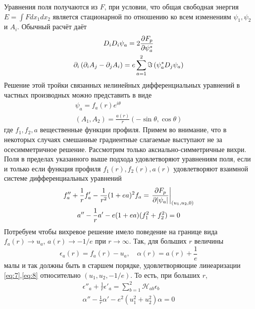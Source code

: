 Уравнения поля получаются из \( F \), при условии, что общая свободная энергия 
\( E = \int F dx_1 dx_2 \) является стационарной по отношению ко всем 
изменениям \( \psi_1, \psi_2 \) и \( A_i \). Обычный расчёт даёт 
\begin{gather}
    D_i D_i \psi_a = 2\frac{\partial F_p}{\partial \psi_a^{*}}
    \label{eq:4} \\
    \partial_i \left( \partial_i A_j - \partial_j A_i \right) = 
        e\sum\limits_{a=1}^{2}\Im\left( \psi_a^* D_j \psi_a \right)
    \label{eq:5}
\end{gather}
Решение этой тройки связанных нелинейных дифференциальных уравнений в частных 
производных можно представить в виде
\begin{gather}
    \psi_a = f_a(r)e^{i\theta} \nonumber \\
    (A_1, A_2) = \frac{a(r)}{r}(-\sin\theta, \cos\theta)
    \label{eq:6}
\end{gather}
где \( f_1, f_2, a \) вещественные функции профиля. Примем во внимание, что 
в некоторых случаях смешанные градиентные слагаемые выступают не за 
осесимметричное решение. Рассмотрим только аксиально-симметричные вихри. 
Поля в пределах указанного выше подхода удовлетворяют уравнениям поля, если и 
только если функция профиля \( f_1(r), f_2(r), a(r) \) удовлетворяют взаимной 
системе дифференциальных уравнений
\begin{gather}
    f''_a + \frac{1}{r} f'_a - \frac{1}{r^2}(1+ea)^2 f_a = 
        \left. \frac{\partial F_p}{\partial |\psi_a|} \right|_{(u_1, u_2, 0)}
    \label{eq:7} \\
    a'' - \frac{1}{r} a' - e(1+ea)(f_1^2+f_2^2) = 0
    \label{eq:8}
\end{gather}
Потребуем чтобы вихревое решение имело поведение на границе вида 
\( f_a(r) \rightarrow u_a \), \( a(r) \rightarrow -1/e \) при
\( r \rightarrow \infty \). Так, для больших \( r \) величины
\begin{equation}
    \epsilon_a(r) = f_a(r) - u_a, \quad
    \alpha(r) = a(r) + \frac{1}{e}
    \label{eq:9}
\end{equation}
малы и так должны быть в старшем порядке, удовлетворяющие линеаризации 
\eqref{eq:7},\eqref{eq:8} относительно \( (u_1, u_2, -1/e) \). То есть, при 
больших \( r \),
\begin{gather}
    \epsilon''_a + \frac{1}{r} \epsilon'_a = \sum\limits_{b=1}^{2}
        \mathcal{H}_{ab} \epsilon_b
    \label{eq:10} \\
    \alpha'' - \frac{1}{r} \alpha' - e^2(u_1^2 + u_2^2 )\alpha = 0
    \label{eq:11}
\end{gather}
